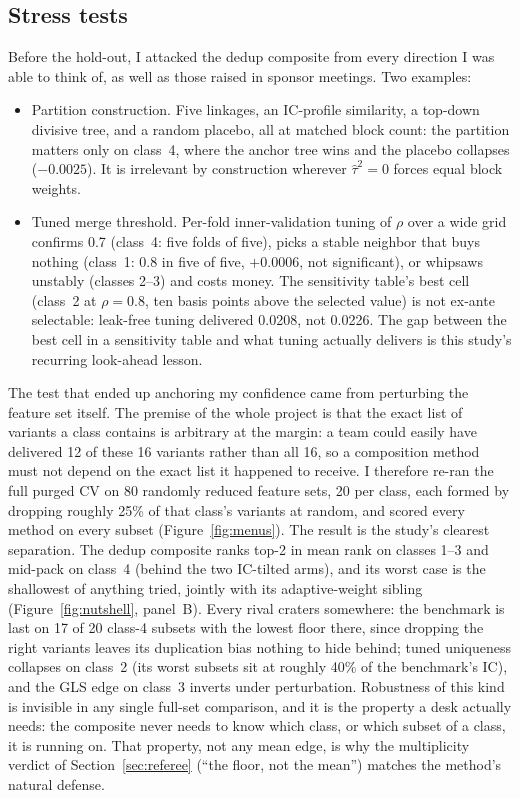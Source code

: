 \documentclass[11pt]{article}
\begin{document}
\FloatBarrier
\subsection{Stress tests}
\label{sec:insample-stress}

Before the hold-out, I attacked the dedup composite from every direction I was able to
think of, as well as those raised in sponsor meetings. Two examples:

\begin{itemize}
\item Partition construction. Five linkages, an IC-profile similarity, a top-down
      divisive tree, and a random placebo, all at matched block count: the partition
      matters only on class~4, where the anchor tree wins and the placebo collapses
      ($-0.0025$). It is irrelevant by construction wherever $\hat\tau^2=0$ forces equal
      block weights.
\item Tuned merge threshold. Per-fold inner-validation tuning of $\rho$ over a
      wide grid confirms 0.7 (class~4: five folds of five), picks a stable neighbor that
      buys nothing (class~1: 0.8 in five of five, $+0.0006$, not significant), or
      whipsaws unstably (classes 2--3) and costs money. The sensitivity table's best cell
      (class~2 at $\rho=0.8$, ten basis points above the selected value) is not ex-ante
      selectable: leak-free tuning delivered 0.0208, not 0.0226. The gap between the best
      cell in a sensitivity table and what tuning actually delivers is this study's
      recurring look-ahead lesson.
\end{itemize}

The test that ended up anchoring my confidence came from perturbing the feature set
itself. The premise of the whole project is that the exact list of variants a class
contains is arbitrary at the margin: a team could easily have delivered 12 of these 16
variants rather than all 16, so a composition method must not depend on the exact list it
happened to receive. I therefore re-ran the full purged CV on 80 randomly reduced feature
sets, 20 per class, each formed by dropping roughly 25\% of that class's variants at
random, and scored every method on every subset (Figure~\ref{fig:menus}). The result is
the study's clearest separation. The dedup composite ranks top-2 in mean rank on classes
1--3 and mid-pack on class~4 (behind the two IC-tilted arms), and its worst case is the
shallowest of anything tried, jointly with its adaptive-weight sibling
(Figure~\ref{fig:nutshell}, panel~B). Every rival craters somewhere: the benchmark is
last on 17 of 20 class-4 subsets with the lowest floor there, since dropping the right
variants leaves its duplication bias nothing to hide behind; tuned uniqueness collapses on class~2
(its worst subsets sit at roughly 40\% of the benchmark's IC), and the GLS edge on
class~3 inverts under perturbation. Robustness of this kind is invisible in any single
full-set comparison, and it is the property a desk actually needs: the composite never
needs to know which class, or which subset of a class, it is running on. That property,
not any mean edge, is why the multiplicity verdict of Section~\ref{sec:referee} (``the
floor, not the mean'') matches the method's natural defense.
\end{document}
